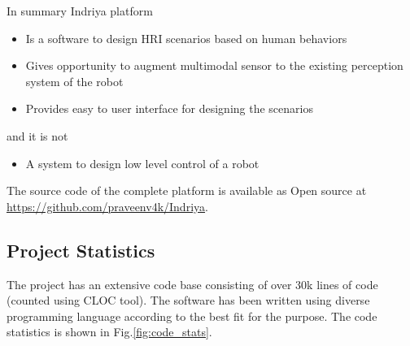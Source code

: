 In summary Indriya platform
\begin{itemize}
\item Is a software to design HRI scenarios based on human behaviors
\item Gives opportunity to augment multimodal sensor to the existing perception system of the robot
\item Provides easy to user interface for designing the scenarios
\end{itemize}
and it is not
\begin{itemize}
\item A system to design low level control of a robot
\end{itemize}
	
The source code of the complete platform is available as Open source at \url{https://github.com/praveenv4k/Indriya}. 
\subsection{Project Statistics}
The project has an extensive code base consisting of over 30k lines of code (counted using CLOC tool). The software has been written using diverse programming language according to the best fit for the purpose. The code statistics is shown in Fig.\ref{fig:code_stats}.

